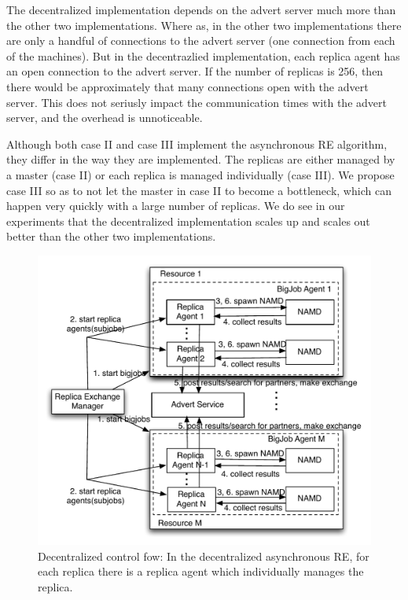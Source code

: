 \documentclass{rspublic}
\begin{document}
The decentralized implementation depends on the advert server much more than the other two implementations. Where as, in the other two implementations there are only a handful of connections to the advert server (one connection from each of the machines). But in the decentrazlied implementation, each replica agent has an open connection to the advert server. If the number of replicas is 256, then there would be approximately that many connections open with the advert server. This does not seriusly impact the communication times with the advert server, and the overhead is unnoticeable.

Although both case II and case III implement the asynchronous RE algorithm, they differ in the way they are implemented. The replicas are either managed by a master (case II) or each replica is managed individually (case III). We propose case III so as to not let the master in case II to become a bottleneck, which can happen very quickly with a large number of replicas. We do see in our experiments that the decentralized implementation scales up and scales out better than the other two implementations.

\begin{figure}
\centering
\includegraphics[width=1\textwidth]{asyncre.pdf}
\caption{\small Decentralized control fow: In the decentralized asynchronous RE, for  each replica there is a replica agent which individually manages the replica.}
\label{fig:decent}
\end{figure}
\end{document}
